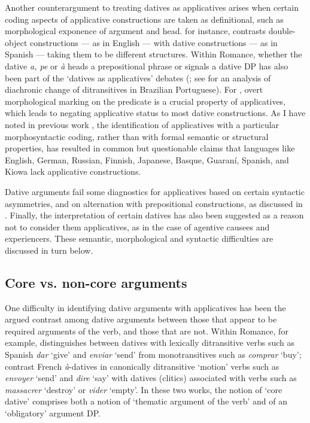\documentclass[output=paper,colorlinks,citecolor=brown,modfonts,nonflat]{langsci/langscibook}
\begin{document}
Another counterargument to treating datives as applicatives arises when certain coding aspects of applicative constructions are taken as definitional, such as morphological exponence of argument and head. \citet{Snyder1995} for instance, contrasts double-object constructions — as in English — with dative constructions — as in Spanish — taking them to be different structures. Within Romance, whether the dative \textit{a, pe} or \textit{à} heads a prepositional phrase or signals a dative DP has also been part of the ‘datives as applicatives’ debates (; see  for an analysis of diachronic change of ditransitives in Brazilian Portuguese). For \citet{Polinsky2013}, overt morphological marking on the predicate is a crucial property of applicatives, which leads to negating applicative status to most dative constructions. As I have noted in previous work \citep[131]{Cuervo2015Chapter}, the identification of applicatives with a particular morphosyntactic coding, rather than with formal semantic or structural properties, has resulted in common but questionable claims that languages like English, German, Russian, Finnish, Japanese, Basque, Guaraní, Spanish, and Kiowa lack applicative constructions.

Dative arguments fail some diagnostics for applicatives based on certain syntactic asymmetries, and on alternation with prepositional constructions, as discussed in . Finally, the interpretation of certain datives has also been suggested as a reason not to consider them applicatives, as in the case of agentive causees \citep{Tubino2012} and experiencers.  These semantic, morphological and syntactic difficulties are discussed in turn below.

\subsection{Core vs. non-core arguments}\label{sec:cuervo:2.1}

One difficulty in identifying dative arguments with applicatives has been the argued contrast among dative arguments between those that appear to be required arguments of the verb, and those that are not. Within Romance, for example, \citet{Pujalte2009} distinguishes between datives with lexically ditransitive verbs such as Spanish \textit{dar} ‘give’ and \textit{enviar} ‘send’ from monotransitives such as \textit{comprar} ‘buy’; \citet{BonehNash2012} contrast French \textit{à}-datives in canonically ditransitive ‘motion’ verbs such as \textit{envoyer} ‘send’ and \textit{dire} ‘say’ with datives (clitics) associated with verbs such as \textit{massacrer} ‘destroy’ or \textit{vider} ‘empty’. In these two works, the notion of ‘core dative’ comprises both a notion of ‘thematic argument of the verb’ and of an ‘obligatory’ argument DP.
\end{document}
